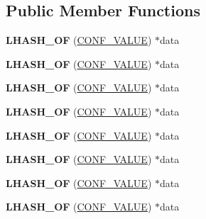 \subsection*{Public Member Functions}
\begin{DoxyCompactItemize}
\item 
\mbox{\label{structconf__st_a3797fc4b6a3018cf1dafa269a4ad1bbb}} 
{\bfseries L\+H\+A\+S\+H\+\_\+\+OF} (\hyperlink{structCONF__VALUE}{C\+O\+N\+F\+\_\+\+V\+A\+L\+UE}) $\ast$data
\item 
\mbox{\label{structconf__st_a3797fc4b6a3018cf1dafa269a4ad1bbb}} 
{\bfseries L\+H\+A\+S\+H\+\_\+\+OF} (\hyperlink{structCONF__VALUE}{C\+O\+N\+F\+\_\+\+V\+A\+L\+UE}) $\ast$data
\item 
\mbox{\label{structconf__st_a3797fc4b6a3018cf1dafa269a4ad1bbb}} 
{\bfseries L\+H\+A\+S\+H\+\_\+\+OF} (\hyperlink{structCONF__VALUE}{C\+O\+N\+F\+\_\+\+V\+A\+L\+UE}) $\ast$data
\item 
\mbox{\label{structconf__st_a3797fc4b6a3018cf1dafa269a4ad1bbb}} 
{\bfseries L\+H\+A\+S\+H\+\_\+\+OF} (\hyperlink{structCONF__VALUE}{C\+O\+N\+F\+\_\+\+V\+A\+L\+UE}) $\ast$data
\item 
\mbox{\label{structconf__st_a3797fc4b6a3018cf1dafa269a4ad1bbb}} 
{\bfseries L\+H\+A\+S\+H\+\_\+\+OF} (\hyperlink{structCONF__VALUE}{C\+O\+N\+F\+\_\+\+V\+A\+L\+UE}) $\ast$data
\item 
\mbox{\label{structconf__st_a3797fc4b6a3018cf1dafa269a4ad1bbb}} 
{\bfseries L\+H\+A\+S\+H\+\_\+\+OF} (\hyperlink{structCONF__VALUE}{C\+O\+N\+F\+\_\+\+V\+A\+L\+UE}) $\ast$data
\item 
\mbox{\label{structconf__st_a3797fc4b6a3018cf1dafa269a4ad1bbb}} 
{\bfseries L\+H\+A\+S\+H\+\_\+\+OF} (\hyperlink{structCONF__VALUE}{C\+O\+N\+F\+\_\+\+V\+A\+L\+UE}) $\ast$data
\item 
\mbox{\label{structconf__st_a3797fc4b6a3018cf1dafa269a4ad1bbb}} 
{\bfseries L\+H\+A\+S\+H\+\_\+\+OF} (\hyperlink{structCONF__VALUE}{C\+O\+N\+F\+\_\+\+V\+A\+L\+UE}) $\ast$data
\end{DoxyCompactItemize}

